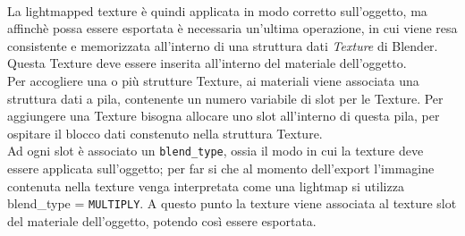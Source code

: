 \\
La lightmapped texture è quindi applicata in modo corretto sull’oggetto, ma affinchè possa essere esportata è necessaria un'ultima operazione, in cui viene resa consistente e memorizzata all’interno di una struttura dati \emph{Texture} di Blender.
Questa Texture deve essere inserita all’interno del materiale dell’oggetto.
\\
Per accogliere una o più strutture Texture, ai materiali viene associata una struttura dati a pila, contenente un numero variabile di slot per le Texture.
Per aggiungere una Texture bisogna allocare uno slot all’interno di questa pila, per ospitare il blocco dati constenuto nella struttura Texture. 
\\
Ad ogni slot è associato un \texttt{blend\_type}, ossia il modo in cui la texture deve essere applicata sull’oggetto; per far si che al momento dell’export l’immagine contenuta nella texture venga interpretata come una lightmap si utilizza blend\_type = \texttt{MULTIPLY}. 
A questo punto la texture viene associata al texture slot del materiale dell’oggetto, potendo così essere esportata.